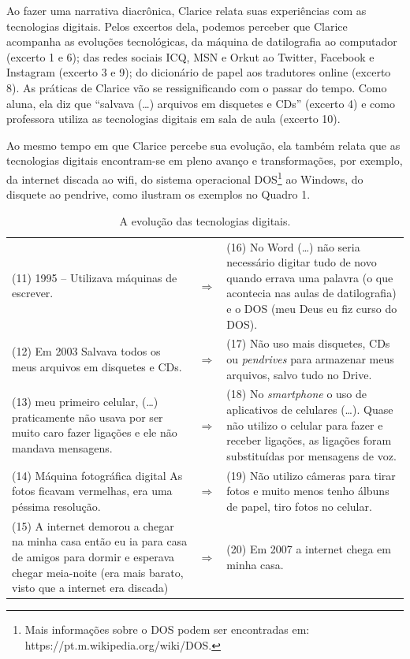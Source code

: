 \documentclass{textolivre}
\begin{document}
Ao fazer uma narrativa diacrônica, Clarice relata suas experiências com as tecnologias digitais. Pelos excertos dela, podemos perceber que Clarice acompanha as evoluções tecnológicas, da máquina de datilografia ao computador (excerto 1 e 6); das redes sociais ICQ, MSN e Orkut ao Twitter, Facebook e Instagram (excerto 3 e 9); do dicionário de papel aos tradutores online (excerto 8). As práticas de Clarice vão se ressignificando com o passar do tempo. Como aluna, ela diz que “salvava (\ldots) arquivos em disquetes e CDs” (excerto 4) e como professora utiliza as tecnologias digitais em sala de aula (excerto 10). 

Ao mesmo tempo em que Clarice percebe sua evolução, ela também relata que as tecnologias digitais encontram-se em pleno avanço e transformações, por exemplo, da internet discada ao wifi, do sistema operacional DOS\footnote{Mais informações sobre o DOS podem ser encontradas em: https://pt.m.wikipedia.org/wiki/DOS. } ao Windows, do disquete ao pendrive, como ilustram os exemplos no Quadro 1.

\begin{table}[htpb]
\caption{A evolução das tecnologias digitais.}
\label{tbl-tabela-01}
\begin{tabular}{p{}cp{}}
\toprule
(11) 1995 – Utilizava máquinas de escrever.  & $\Rightarrow$  & (16) No Word (\ldots) não seria necessário digitar tudo de novo quando errava uma palavra (o que acontecia nas aulas de datilografia) e o DOS (meu Deus eu fiz curso do DOS).  \\
(12) Em 2003 Salvava todos os meus arquivos em disquetes e CDs.  & $\Rightarrow$ & (17) Não uso mais disquetes, CDs ou \textit{pendrives} para armazenar meus arquivos, salvo tudo no Drive.\\
(13) meu primeiro celular, (\ldots) praticamente não usava por ser muito caro fazer ligações e ele não mandava mensagens.  & $\Rightarrow$ & (18) No \textit{smartphone} o uso de aplicativos de celulares (\ldots). Quase não utilizo o celular para fazer e receber ligações, as ligações foram substituídas por mensagens de voz. \\
(14) Máquina fotográfica digital As fotos ficavam vermelhas, era uma péssima resolução.  & $\Rightarrow$  & (19) Não utilizo câmeras para tirar fotos e muito menos tenho álbuns de papel, tiro fotos no celular.  \\
(15) A internet demorou a chegar na minha casa então eu ia para casa de amigos para dormir e esperava chegar meia-noite (era mais barato, visto que a internet era discada) & $\Rightarrow$ & (20) Em 2007 a internet chega em minha casa. \\
\bottomrule
\end{tabular}
\end{table}
\end{document}
